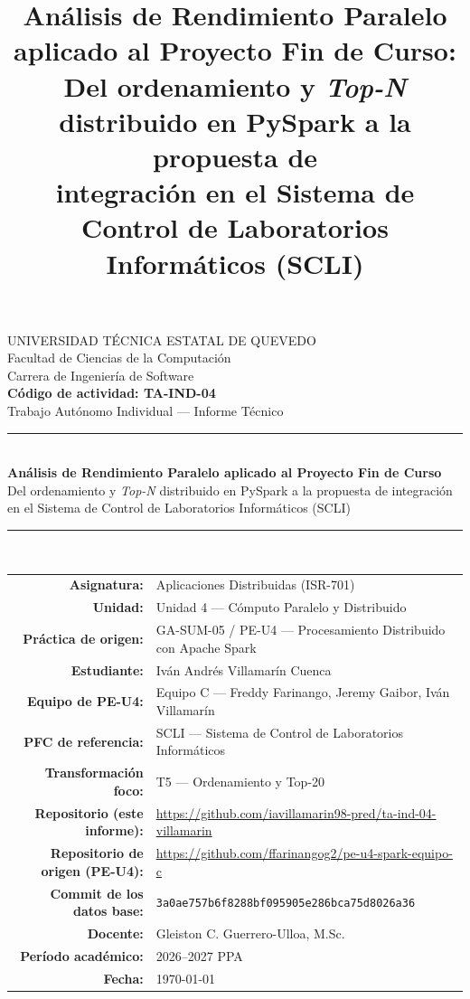 \documentclass[10pt,conference]{IEEEtran}
\title{Análisis de Rendimiento Paralelo aplicado al Proyecto Fin de Curso:\\
Del ordenamiento y \emph{Top-N} distribuido en PySpark a la propuesta de\\
integración en el Sistema de Control de Laboratorios Informáticos (SCLI)}
\author{
\IEEEauthorblockN{Iván Andrés Villamarín Cuenca}
\IEEEauthorblockA{Facultad de Ciencias de la Computación --- UTEQ}
}
\begin{document}
\shorthandoff{<>}


\begin{titlepage}
\onecolumn
\centering
\vspace*{1cm}
{\large UNIVERSIDAD TÉCNICA ESTATAL DE QUEVEDO}\\[2mm]
{\normalsize Facultad de Ciencias de la Computación}\\
{\normalsize Carrera de Ingeniería de Software}\\[10mm]

{\Large\bfseries Código de actividad: TA-IND-04}\\[2mm]
{\normalsize Trabajo Autónomo Individual --- Informe Técnico}\\[10mm]

\rule{0.9\linewidth}{0.4pt}\\[4mm]
{\LARGE\bfseries Análisis de Rendimiento Paralelo aplicado al Proyecto Fin de Curso}\\[3mm]
{\large Del ordenamiento y \emph{Top-N} distribuido en PySpark a la propuesta de integración\\ en el Sistema de Control de Laboratorios Informáticos (SCLI)}\\[4mm]
\rule{0.9\linewidth}{0.4pt}\\[12mm]

\begin{tabular}{@{}rl@{}}
\textbf{Asignatura:} & Aplicaciones Distribuidas (ISR-701) \\[1mm]
\textbf{Unidad:} & Unidad 4 --- Cómputo Paralelo y Distribuido \\[1mm]
\textbf{Práctica de origen:} & GA-SUM-05 / PE-U4 --- Procesamiento Distribuido con Apache Spark \\[1mm]
\textbf{Estudiante:} & Iván Andrés Villamarín Cuenca \\[1mm]
\textbf{Equipo de PE-U4:} & Equipo C --- Freddy Farinango, Jeremy Gaibor, Iván Villamarín \\[1mm]
\textbf{PFC de referencia:} & SCLI --- Sistema de Control de Laboratorios Informáticos \\[1mm]
\textbf{Transformación foco:} & T5 --- Ordenamiento y Top-20 \\[1mm]
\textbf{Repositorio (este informe):} & \url{https://github.com/iavillamarin98-pred/ta-ind-04-villamarin} \\[1mm]
\textbf{Repositorio de origen (PE-U4):} & \url{https://github.com/ffarinangog2/pe-u4-spark-equipo-c} \\[1mm]
\textbf{Commit de los datos base:} & \texttt{3a0ae757b6f8288bf095905e286bca75d8026a36} \\[1mm]
\textbf{Docente:} & Gleiston C. Guerrero-Ulloa, M.Sc. \\[1mm]
\textbf{Período académico:} & 2026--2027 PPA \\[1mm]
\textbf{Fecha:} & \today \\
\end{tabular}

\vfill
\end{titlepage}
\twocolumn
\end{document}
